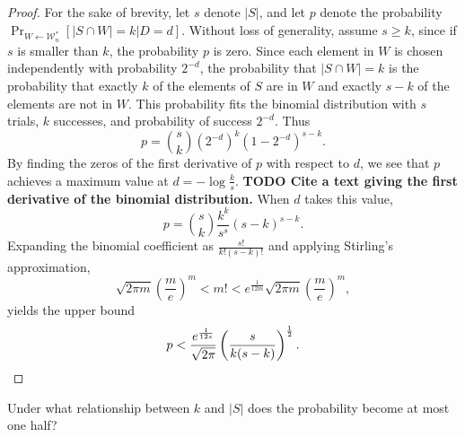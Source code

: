 \documentclass{article}
\newcommand{\todo}[1]{\textbf{TODO #1}}
\newcommand{\mc}{\mathcal}
\begin{document}
\begin{proof}
  For the sake of brevity, let $s$ denote $|S|$, and let $p$ denote the probability $\Pr_{W \gets \mc{W}_n^*}[ |S \cap W| = k | D = d]$.
  Without loss of generality, assume $s \geq k$, since if $s$ is smaller than $k$, the probability $p$ is zero.
  Since each element in $W$ is chosen independently with probability $2^{-d}$, the probability that $|S \cap W| = k$ is the probability that exactly $k$ of the elements of $S$ are in $W$ and exactly $s - k$ of the elements are not in $W$.
  This probability fits the binomial distribution with $s$ trials, $k$ successes, and probability of success $2^{-d}$.
  Thus
  \begin{equation*}
    p = \binom{s}{k} (2^{-d})^k (1 - 2^{-d})^{s - k}.
  \end{equation*}
  By finding the zeros of the first derivative of $p$ with respect to $d$, we see that $p$ achieves a maximum value at $d = -\log \frac{k}{s}$.
  \todo{Cite a text giving the first derivative of the binomial distribution.}
  When $d$ takes this value,
  \begin{equation*}
    p = \binom{s}{k} \frac{k^k}{s^s} (s - k)^{s - k}.  %
  \end{equation*}
  Expanding the binomial coefficient as $\frac{s!}{k!(s - k)!}$ and applying Stirling's approximation,
  \begin{equation*}
    \sqrt{2 \pi m} \left(\frac{m}{e}\right)^m < m! < e^{\frac{1}{12m}} \sqrt{2 \pi m} \left(\frac{m}{e}\right)^m,
  \end{equation*}
  yields the upper bound
  \begin{equation*}
    p < \frac{e^{\frac{1}{12s}}}{\sqrt{2 \pi}} \left(\frac{s}{k (s - k)}\right)^{\frac{1}{2}}. \qedhere
  \end{equation*}
\end{proof}

Under what relationship between $k$ and $|S|$ does the probability become at most one half?
\end{document}
